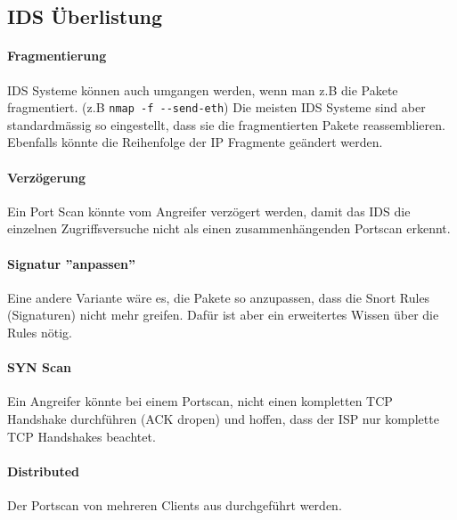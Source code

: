 \subsection{IDS Überlistung}
\paragraph{Fragmentierung} IDS Systeme können auch umgangen werden, wenn man z.B die Pakete fragmentiert. (z.B \lstinline|nmap -f --send-eth|) Die meisten IDS Systeme sind aber standardmässig so eingestellt, dass sie die fragmentierten Pakete reassemblieren. Ebenfalls könnte die Reihenfolge der IP Fragmente geändert werden.

\paragraph{Verzögerung} Ein Port Scan könnte vom Angreifer verzögert werden, damit das IDS die einzelnen Zugriffsversuche nicht als einen zusammenhängenden Portscan erkennt.

\paragraph{Signatur ''anpassen''} Eine andere Variante wäre es, die Pakete so anzupassen, dass die Snort Rules (Signaturen) nicht mehr greifen. Dafür ist aber ein erweitertes Wissen über die Rules nötig.

\paragraph{SYN Scan} Ein Angreifer könnte bei einem Portscan,  nicht einen kompletten TCP Handshake durchführen (ACK dropen) und hoffen, dass der ISP nur komplette TCP Handshakes beachtet.

\paragraph{Distributed} Der Portscan von mehreren Clients aus durchgeführt werden.

